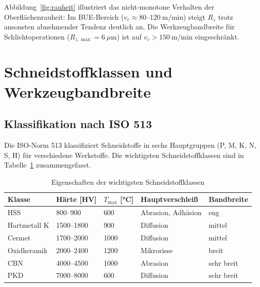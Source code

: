 ﻿\documentclass[a4paper,12pt]{article}
\theoremstyle{definition}
\begin{document}
Abbildung~\ref{fig:rauheit} illustriert das nicht-monotone Verhalten der
Oberflächenrauheit: Im BUE-Bereich ($v_c \approx 80\text{--}120~\text{m/min}$)
steigt $R_z$ trotz ansonsten abnehmender Tendenz deutlich an. Die
Werkzeugbandbreite für Schlichtoperationen ($R_{z,\max} = 6~\mu\text{m}$) ist
auf $v_c > 150~\text{m/min}$ eingeschränkt.

\section{Schneidstoffklassen und Werkzeugbandbreite}
\label{sec:schneidstoffe}

\subsection{Klassifikation nach ISO 513}

Die ISO-Norm 513 klassifiziert Schneidstoffe in sechs Hauptgruppen (P, M, K, N,
S, H) für verschiedene Werkstoffe. Die wichtigsten Schneidstoffklassen sind in
Tabelle~\ref{tab:schneidstoffe} zusammengefasst.

\begin{table}[ht]
  \centering
  \caption{Eigenschaften der wichtigsten Schneidstoffklassen}
  \label{tab:schneidstoffe}
  \small
  \begin{tabular}{lllll}
    \toprule
    Klasse & Härte [HV] & $T_{\max}$ [\si{\celsius}] & Hauptverschleiß & Bandbreite \\
    \midrule
    HSS          & 800--900   & 600  & Abrasion, Adhäsion & eng   \\
    Hartmetall K & 1500--1800 & 900  & Diffusion          & mittel\\
    Cermet       & 1700--2000 & 1000 & Diffusion          & mittel\\
    Oxidkeramik  & 2000--2400 & 1200 & Mikrorisse         & breit \\
    CBN          & 4000--4500 & 1000 & Abrasion           & sehr breit\\
    PKD          & 7000--8000 & 600  & Diffusion          & sehr breit\\
    \bottomrule
  \end{tabular}
\end{table}
\end{document}
